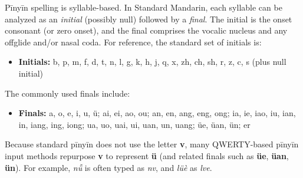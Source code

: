 Pīnyīn spelling is syllable-based. In Standard Mandarin, each syllable can be analyzed as an \emph{initial} (possibly null) followed by a \emph{final}. The initial is the onset consonant (or zero onset), and the final comprises the vocalic nucleus and any offglide and/or nasal coda. For reference, the standard set of initials is:

\begin{itemize}
	\item \textbf{Initials:} b, p, m, f, d, t, n, l, g, k, h, j, q, x, zh, ch, sh, r, z, c, s (plus null initial)
\end{itemize}

The commonly used finals include:

\begin{itemize}
	\item \textbf{Finals:} a, o, e, i, u, ü; ai, ei, ao, ou; an, en, ang, eng, ong; ia, ie, iao, iu, ian, in, iang, ing, iong; ua, uo, uai, ui, uan, un, uang; üe, üan, ün; er
\end{itemize}

Because standard pīnyīn does not use the letter \textbf{v}, many QWERTY-based pīnyīn input methods repurpose \textbf{v} to represent \textbf{ü} (and related finals such as \textbf{üe}, \textbf{üan}, \textbf{ün}). For example, \textit{nǚ} is often typed as \textit{nv}, and \textit{lüè} as \textit{lve}.

